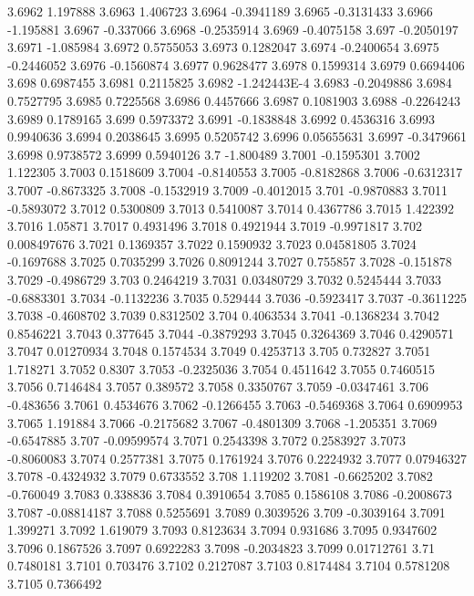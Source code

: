 3.6962  1.197888
3.6963  1.406723
3.6964  -0.3941189
3.6965  -0.3131433
3.6966  -1.195881
3.6967  -0.337066
3.6968  -0.2535914
3.6969  -0.4075158
3.697  -0.2050197
3.6971  -1.085984
3.6972  0.5755053
3.6973  0.1282047
3.6974  -0.2400654
3.6975  -0.2446052
3.6976  -0.1560874
3.6977  0.9628477
3.6978  0.1599314
3.6979  0.6694406
3.698  0.6987455
3.6981  0.2115825
3.6982  -1.242443E-4
3.6983  -0.2049886
3.6984  0.7527795
3.6985  0.7225568
3.6986  0.4457666
3.6987  0.1081903
3.6988  -0.2264243
3.6989  0.1789165
3.699  0.5973372
3.6991  -0.1838848
3.6992  0.4536316
3.6993  0.9940636
3.6994  0.2038645
3.6995  0.5205742
3.6996  0.05655631
3.6997  -0.3479661
3.6998  0.9738572
3.6999  0.5940126
3.7  -1.800489
3.7001  -0.1595301
3.7002  1.122305
3.7003  0.1518609
3.7004  -0.8140553
3.7005  -0.8182868
3.7006  -0.6312317
3.7007  -0.8673325
3.7008  -0.1532919
3.7009  -0.4012015
3.701  -0.9870883
3.7011  -0.5893072
3.7012  0.5300809
3.7013  0.5410087
3.7014  0.4367786
3.7015  1.422392
3.7016  1.05871
3.7017  0.4931496
3.7018  0.4921944
3.7019  -0.9971817
3.702  0.008497676
3.7021  0.1369357
3.7022  0.1590932
3.7023  0.04581805
3.7024  -0.1697688
3.7025  0.7035299
3.7026  0.8091244
3.7027  0.755857
3.7028  -0.151878
3.7029  -0.4986729
3.703  0.2464219
3.7031  0.03480729
3.7032  0.5245444
3.7033  -0.6883301
3.7034  -0.1132236
3.7035  0.529444
3.7036  -0.5923417
3.7037  -0.3611225
3.7038  -0.4608702
3.7039  0.8312502
3.704  0.4063534
3.7041  -0.1368234
3.7042  0.8546221
3.7043  0.377645
3.7044  -0.3879293
3.7045  0.3264369
3.7046  0.4290571
3.7047  0.01270934
3.7048  0.1574534
3.7049  0.4253713
3.705  0.732827
3.7051  1.718271
3.7052  0.8307
3.7053  -0.2325036
3.7054  0.4511642
3.7055  0.7460515
3.7056  0.7146484
3.7057  0.389572
3.7058  0.3350767
3.7059  -0.0347461
3.706  -0.483656
3.7061  0.4534676
3.7062  -0.1266455
3.7063  -0.5469368
3.7064  0.6909953
3.7065  1.191884
3.7066  -0.2175682
3.7067  -0.4801309
3.7068  -1.205351
3.7069  -0.6547885
3.707  -0.09599574
3.7071  0.2543398
3.7072  0.2583927
3.7073  -0.8060083
3.7074  0.2577381
3.7075  0.1761924
3.7076  0.2224932
3.7077  0.07946327
3.7078  -0.4324932
3.7079  0.6733552
3.708  1.119202
3.7081  -0.6625202
3.7082  -0.760049
3.7083  0.338836
3.7084  0.3910654
3.7085  0.1586108
3.7086  -0.2008673
3.7087  -0.08814187
3.7088  0.5255691
3.7089  0.3039526
3.709  -0.3039164
3.7091  1.399271
3.7092  1.619079
3.7093  0.8123634
3.7094  0.931686
3.7095  0.9347602
3.7096  0.1867526
3.7097  0.6922283
3.7098  -0.2034823
3.7099  0.01712761
3.71  0.7480181
3.7101  0.703476
3.7102  0.2127087
3.7103  0.8174484
3.7104  0.5781208
3.7105  0.7366492
